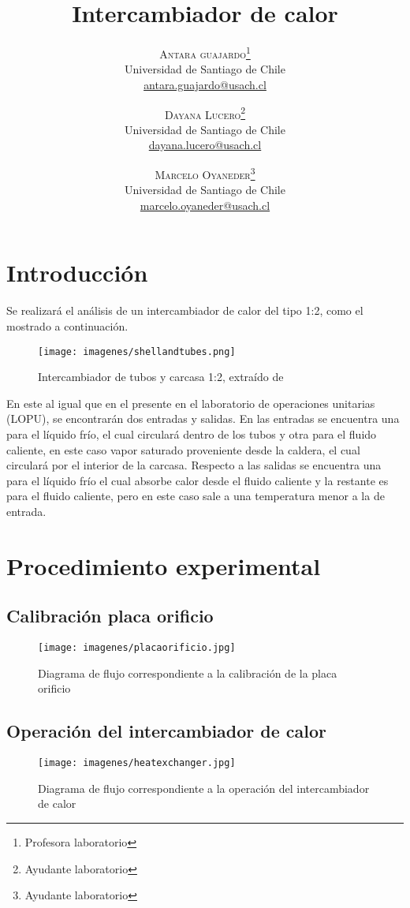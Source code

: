 \documentclass[twoside,twocolumn,letter,10pt]{article}
\title{Intercambiador de calor } %
\author{%
\textsc{A\lowercase{ntara Guajardo}}\thanks{Profesora laboratorio} \\[0.2ex] %
\normalsize Universidad de Santiago de Chile \\ %
\normalsize \href{mailto:antara.guajardo@usach.cl}{antara.guajardo@usach.cl} %
\and %
\textsc{Dayana Lucero}\thanks{Ayudante laboratorio} \\[0.2ex] %
\normalsize Universidad de Santiago de Chile \\ %
\normalsize \href{mailto:dayana.lucero@usach.cl}{dayana.lucero@usach.cl} %
\and %
\textsc{Marcelo Oyaneder}\thanks{Ayudante laboratorio} \\[0.2ex] %
\normalsize Universidad de Santiago de Chile \\ %
\normalsize \href{mailto:marcelo.oyaneder@usach.cl}{marcelo.oyaneder@usach.cl} %
}
\date{} %
\begin{document}
\maketitle


\section{Introducción}

\indent Se realizará el análisis de un intercambiador de calor del tipo 1:2, como el mostrado a continuación.

\begin{figure}[hbtp]
\caption{Intercambiador de tubos y carcasa 1:2, extraído de \cite{cengel2014heat} }
\centering
\texttt{[image: imagenes/shellandtubes.png]}
\end{figure}

En este al igual que en el presente en el laboratorio de operaciones unitarias (LOPU), se encontrarán dos entradas y salidas. En las entradas se encuentra una para el líquido frío, el cual circulará dentro de los tubos y otra para el fluido caliente, en este caso vapor saturado proveniente desde la caldera, el cual circulará por el interior de la carcasa. Respecto a las salidas se encuentra una para el líquido frío el cual absorbe calor desde el fluido caliente y la restante es para el fluido caliente, pero en este caso sale a una temperatura menor a la de entrada.



\newpage
\section{Procedimiento experimental}
\subsection{Calibración placa orificio}
\begin{figure}[hbtp]
\caption{Diagrama de flujo correspondiente a la calibración de la placa orificio}
\centering
\texttt{[image: imagenes/placaorificio.jpg]}
\end{figure}

\newpage
\subsection{Operación del intercambiador de calor}
\begin{figure}[hbtp]
\caption{Diagrama de flujo correspondiente a la operación del intercambiador de calor}
\centering
\texttt{[image: imagenes/heatexchanger.jpg]}
\end{figure}
\end{document}
